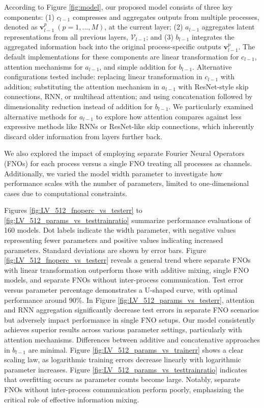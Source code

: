 According to Figure \ref{fig:model}, our proposed model consists of three key components: (1) $c_{l-1}$ compresses and aggregates outputs from multiple processes, denoted as $\mathbf{v}_{l-1}^p\ (p=1,...,M)$, at the current layer; (2) $a_{l-1}$ aggregates latent representations from all previous layers, $\mathcal{V}_{l-1}$; and (3) $b_{l-1}$ integrates the aggregated information back into the original process-specific outputs $\mathbf{v}_{l-1}^p$. The default implementations for these components are linear transformation for $c_{l-1}$, attention mechanisms for $a_{l-1}$, and simple addition for $b_{l-1}$. Alternative configurations tested include: replacing linear transformation in $c_{l-1}$ with addition; substituting the attention mechanism in $a_{l-1}$ with ResNet-style skip connections, RNN, or multihead attention; and using concatenation followed by dimensionality reduction instead of addition for $b_{l-1}$. We particularly examined alternative methods for $a_{l-1}$ to explore how attention compares against less expressive methods like RNNs or ResNet-like skip connections, which inherently discard older information from layers further back.

We also explored the impact of employing separate Fourier Neural Operators (FNOs) for each process versus a single FNO treating all processes as channels. Additionally, we varied the model width parameter to investigate how performance scales with the number of parameters, limited to one-dimensional cases due to computational constraints.

Figures \ref{fig:LV_512_fnoperc_vs_testerr} to \ref{fig:LV_512_params_vs_testtrainratio} summarize performance evaluations of 160 models. Dot labels indicate the width parameter, with negative values representing fewer parameters and positive values indicating increased parameters. Standard deviations are shown by error bars. Figure \ref{fig:LV_512_fnoperc_vs_testerr} reveals a general trend where separate FNOs with linear transformation outperform those with additive mixing, single FNO models, and separate FNOs without inter-process communication. Test error versus parameter percentage demonstrates a U-shaped curve, with optimal performance around 90\%. In Figure \ref{fig:LV_512_params_vs_testerr}, attention and RNN aggregation significantly decrease test errors in separate FNO scenarios but adversely impact performance in single FNO setups. Our model consistently achieves superior results across various parameter settings, particularly with attention mechanisms. Differences between additive and concatenative approaches in $b_{l-1}$ are minimal. Figure \ref{fig:LV_512_params_vs_trainerr} shows a clear scaling law, as logarithmic training errors decrease linearly with logarithmic parameter increases. Figure \ref{fig:LV_512_params_vs_testtrainratio} indicates that overfitting occurs as parameter counts become large. Notably, separate FNOs without inter-process communication perform poorly, emphasizing the critical role of effective information mixing.


